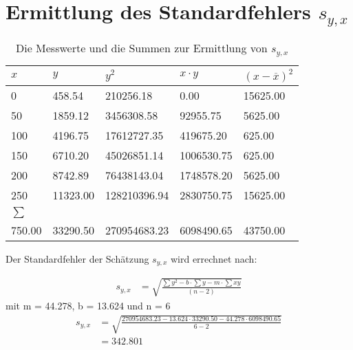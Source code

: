 \documentclass{article}
\begin{document}
\section{Ermittlung des Standardfehlers $s_{y,x}$}

 \begin{table}[ht!]
  \centering
 \begin{tabularx}{\textwidth}{XXXXX}
 $x$  & $y$ & $y^2$ & $x \cdot y$ & $(x-\overline{x})^2$\\
\hline
0   & 458.54  & 210256.18    &0.00       & 15625.00 \\
50  &1859.12  & 3456308.58   &92955.75   & 5625.00 \\
100 &4196.75  & 17612727.35  &419675.20  & 625.00 \\
150 &6710.20  & 45026851.14  &1006530.75 & 625.00 \\
200 &8742.89  & 76438143.04  &1748578.20 & 5625.00 \\
250 &11323.00 & 128210396.94 &2830750.75 & 15625.00 \\
\hline
$\sum$ &  & & & \\
750.00 & 33290.50 & 270954683.23 & 6098490.65 & 43750.00 \\
\hline
\end{tabularx}
 \caption{Die Messwerte und die Summen zur Ermittlung von $s_{y,x}$}
\end{table}
\begin{flushleft}
  Der Standardfehler der Schätzung $s_{y,x}$ wird errechnet nach:

\end{flushleft}
\begin{align}
 s_{y,x} &= \sqrt{\frac{\sum y^2 - b \cdot \sum y - m \cdot \sum xy}{(n-2)}}
\end{align}
mit m = 44.278, b = 13.624 und n = 6
\begin{align*}
  s_{y,x} &=\sqrt{ \frac{270954683.23 - 13.624 \cdot 33290.50 -44.278 \cdot 6098490.65} {6-2}} \\
  &= 342.801
\end{align*}
\newpage
\end{document}

